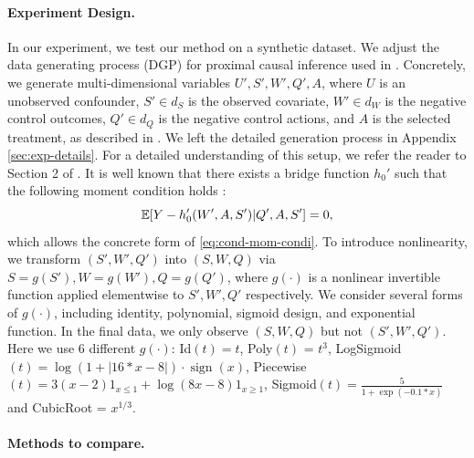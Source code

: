 \paragraph{Experiment Design.} In our experiment, we test our method on a synthetic dataset. We adjust the data generating process (DGP) for proximal causal inference used in \cite{cui2020semiparametric,miao2018confounding,deaner2021many}. Concretely, we generate multi-dimensional
variables $U',S', W',Q',A$, where $U$ is an unobserved confounder, $S'\in d_{S}$ is the observed covariate, $W'\in d_{W}$ is the negative control outcomes, $Q'\in d_{Q}$ is the negative control actions, and $A$ is the selected treatment, as described in . We left the detailed generation process in Appendix \ref{sec:exp-details}.  For a detailed understanding of this setup, we refer the reader to Section 2 of \citet{kallus2021causal}. It is well known that there exists a bridge function $h_0'$ such that the following moment condition holds \citep{cui2020semiparametric,kallus2021causal}: $$
\mathbb{E}[Y - h_0'(W',A,S')|Q',A,S'] = 0,
$$
which allows the concrete form of \eqref{eq:cond-mom-condi}.
To introduce nonlinearity, we transform $(S', W',Q')$ into $(S,W,Q)$ via $S = g(S'), W = g(W'), Q=g(Q')$, where $g(\cdot)$ is a nonlinear invertible function
applied elementwise to $S',W',Q'$ respectively. We consider several forms of $g(\cdot)$, including identity, polynomial, sigmoid design, and exponential function.  In the final data, we only observe $(S,W,Q)$ but not $(S',W',Q')$.  Here we use 6 different $g(\cdot)$: Id$(t) = t$, Poly$(t)$ = $t^3$, LogSigmoid$(t)= \log(1+ |16*x - 8|) \cdot \operatorname{sign}(x)$, Piecewise$(t) = 3(x-2)1_{x\leq1}+ \log(8x-8)1_{x\geq1}$, Sigmoid$(t) = \frac{5}{1+\exp(-0.1*x)}$ and CubicRoot = $x^{1/3}$.

\paragraph{Methods to compare.}

